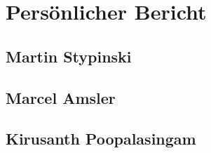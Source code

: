 \newpage

\chapter{Persönlicher Bericht}


\section{Martin Stypinski}


\section{Marcel Amsler}


\section{Kirusanth Poopalasingam}

